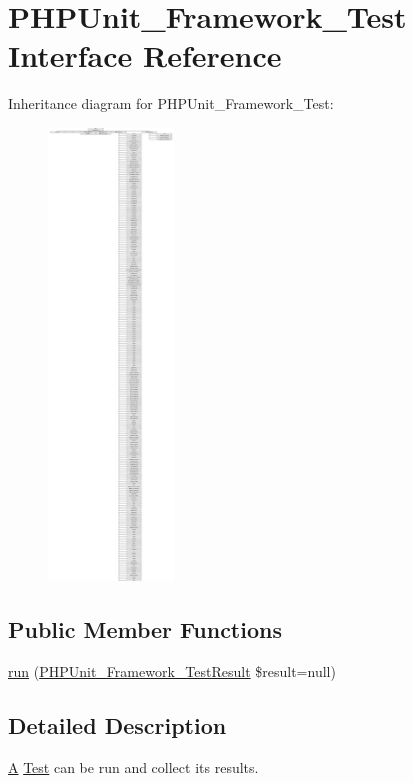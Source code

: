 \hypertarget{interface_p_h_p_unit___framework___test}{}\section{P\+H\+P\+Unit\+\_\+\+Framework\+\_\+\+Test Interface Reference}
\label{interface_p_h_p_unit___framework___test}
Inheritance diagram for P\+H\+P\+Unit\+\_\+\+Framework\+\_\+\+Test\+:\begin{figure}[H]
\begin{center}
\leavevmode
\includegraphics[height=12.000000cm]{interface_p_h_p_unit___framework___test}
\end{center}
\end{figure}
\subsection*{Public Member Functions}
\begin{DoxyCompactItemize}
\item 
\mbox{\hyperlink{interface_p_h_p_unit___framework___test_aba2e5a83092b40735a7a61c572cd6256}{run}} (\mbox{\hyperlink{class_p_h_p_unit___framework___test_result}{P\+H\+P\+Unit\+\_\+\+Framework\+\_\+\+Test\+Result}} \$result=null)
\end{DoxyCompactItemize}


\subsection{Detailed Description}
\mbox{\hyperlink{class_a}{A}} \mbox{\hyperlink{class_test}{Test}} can be run and collect its results. 

